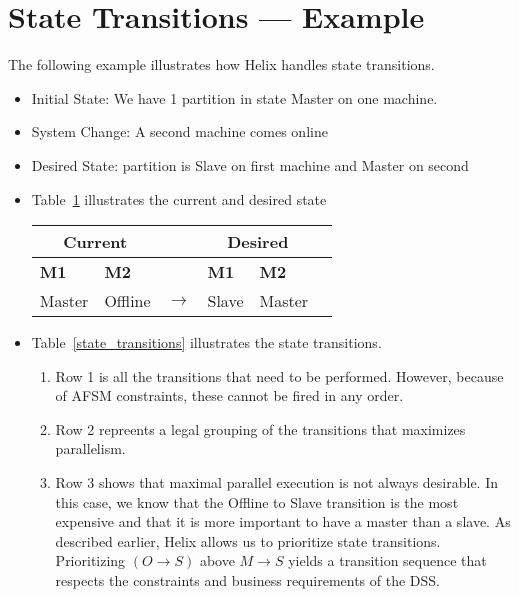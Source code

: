 \documentclass[12pt]{article}
\begin{document}
\section{State Transitions --- Example}

The following example illustrates how Helix handles state transitions.
\begin{itemize}
\item Initial State: We have 1 partition in state Master on one machine. 
\item System Change: A second machine comes online 
\item Desired State: partition is Slave on first machine and
Master on second
\item 
Table~\ref{current_to_desired} illustrates the current and desired state
\begin{table}[h]
\centering
\begin{tabular}{|l|l|l|l|l|l|} \hline \hline
\multicolumn{2}{|c|}{Current} & & \multicolumn{2}{|c|}{Desired} \\ \hline 
{\bf M1} & {\bf M2} & & {\bf M1} & {\bf M2} \\ \hline
Master   & Offline & \(\rightarrow\) & Slave & Master \\ \hline 
\hline
\end{tabular}
\label{current_to_desired}
\end{table}
\item Table~\ref{state_transitions}  illustrates the state transitions.
\begin{enumerate}
\item Row 1 is all the transitions that need to be performed. However, because
of AFSM constraints, these cannot be fired in any order. 
\item Row 2 repreents
a legal grouping of the transitions that maximizes parallelism. 
\item Row 3 shows that maximal parallel execution is not always desirable. In this case,
we know that the Offline to Slave transition is the most expensive
and that it is more important to have a master than a slave. As
described earlier, Helix allows us to prioritize state transitions.
Prioritizing \((O \rightarrow S)\) above \(M \rightarrow  S\) yields a
transition sequence that respects the constraints and business
requirements of the DSS.
\end{enumerate}
\begin{table}[h]

\end{table}
\end{itemize}
\end{document}
